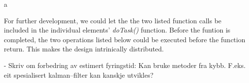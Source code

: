a




	For further development, we could let the the two listed function calls be included in the individual elements' \emph{doTask()} function. 
	Before the funtion is completed, the two operations listed below could be executed before the function return.
	This makes the design intrinically distributed.









	- Skriv om forbedring av estimert fyringstid: Kan bruke metoder fra kybb. F.eks. eit spesialisert kalman--filter kan kanskje utvikles?
	















